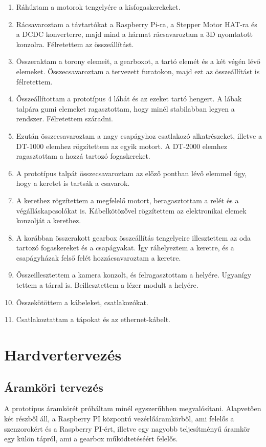 \documentclass[12pt,a4paper]{article}
\begin{document}
\begin{enumerate}
	\item Ráhúztam a motorok tengelyére a kisfogaskerekeket. 
	\item Rácsavaroztam a távtartókat a Raspberry Pi-ra, a Stepper Motor HAT-ra és a DCDC konverterre, majd mind a hármat rácsavaroztam a 3D nyomtatott konzolra. Félretettem az összeállítást.
	\item Összeraktam a torony elemeit, a gearboxot, a tartó elemét és a két végén lévő elemeket. Összecsavaroztam a tervezett furatokon, majd ezt az összeállítást is félretettem. 
	\item Összeállítottam a prototípus 4 lábát és az ezeket tartó hengert. A lábak talpára gumi elemeket ragasztottam, hogy minél stabilabban legyen a rendszer. Félretettem száradni.
	\item Ezután összecsavaroztam a nagy csapágyhoz csatlakozó alkatrészeket, illetve a DT-1000 elemhez rögzítettem az egyik motort. A DT-2000 elemhez ragasztottam a hozzá tartozó fogaskereket.
	\item A prototípus talpát összecsavaroztam az előző pontban lévő elemmel úgy, hogy a keretet is tartsák a csavarok.
	\item A kerethez rögzítettem a megfelelő motort, beragasztottam a relét és a végálláskapcsolókat is. Kábelkötözővel rögzítettem az elektronikai elemek konzolját a kerethez.
	\item A korábban összerakott gearbox összeállítás tengelyeire illesztettem az oda tartozó fogaskereket és a csapágyakat. Így ráhelyeztem a keretre, és a csapágyházak felső felét hozzácsavaroztam a keretre. 
	\item Összeillesztettem a kamera konzolt, és felragasztottam a helyére. Ugyanígy tettem a tárral is. Beillesztettem a lézer modult a helyére.
	\item Összekötöttem a kábeleket, csatlakozókat.
	\item Csatlakoztattam a tápokat és az ethernet-kábelt.
\end{enumerate}

\pagebreak
\section{Hardvertervezés}

\subsection{Áramköri tervezés}
A prototípus áramkörét próbáltam minél egyszerűbben megvalósítani. Alapvetően két részből áll, a Raspberry PI központú vezérlőáramkörből, ami felelős a szenzorokért és a Raspberry PI-ért, illetve egy nagyobb teljesítményű áramkör egy külön tápról, ami a gearbox működtetéséért felelős.
\end{document}
